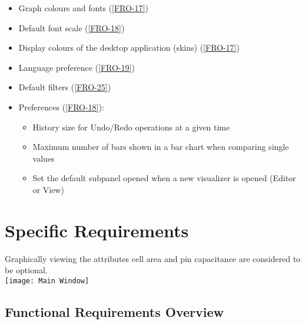 \documentclass[10pt,a4paper]{report}
\begin{document}
\begin{itemize}
    \item Graph colours and fonts (\ref{FRO-17})
    \item Default font scale (\ref{FRO-18})
    \item Display colours of the desktop application (skins) (\ref{FRO-17})
    \item Language preference (\ref{FRO-19})
    \item Default filters (\ref{FRO-25})
    \item Preferences (\ref{FRO-18}):
        \begin{itemize}
            \item History size for Undo/Redo operations at a given time
            \item Maximum number of bars shown in a bar chart when comparing single values
            \item Set the default subpanel opened when a new visualizer is opened (Editor or View)
        \end{itemize}
\end{itemize}

\chapter{Specific Requirements}
Graphically viewing the attributes cell area and pin capacitance are considered to be optional.
\\\texttt{[image: Main Window]}

\newpage
\section{Functional Requirements Overview}
\end{document}
